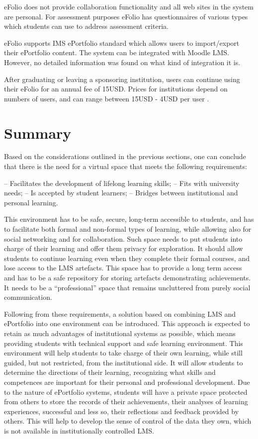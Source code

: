 eFolio does not provide collaboration functionality and all web sites in the
system are personal. For assessment purposes eFolio has questionnaires of
various types which students can use to address assessment criteria.

eFolio supports IMS ePortfolio standard which allows users to import/export
their ePortfolio content. The system can be integrated with Moodle LMS. However,
no detailed information was found on what kind of integration it is.

After graduating or leaving a sponsoring institution, users can continue
using their eFolio for an annual fee of 15USD. Prices for institutions depend
on numbers of users, and can range between 15USD - 4USD per user
\citep{AAEEBL2011}.

\section{Summary}

Based on the considerations outlined in the previous sections, one can conclude that there
is the need for a virtual space that meets the following requirements:

– Facilitates the development of lifelong learning skills;
– Fits with university needs;
– Is accepted by student learners;
– Bridges between institutional and personal learning.

This environment has to be safe, secure, long-term accessible to students, and has to
facilitate both formal and non-formal types of learning, while allowing also for social
networking and for collaboration. Such space needs to put students into charge of their
learning and offer them privacy for exploration. It should allow students to continue
learning even when they complete their formal courses, and lose access to the LMS
artefacts. This space has to provide a long term access and has to be a safe repository for
storing artefacts demonstrating achievements. It needs to be a “professional” space that
remains uncluttered from purely social communication.

Following from these requirements, a solution based on combining LMS and ePortfolio
into one environment can be introduced. This approach is expected to retain as much
advantages of institutional systems as possible, which means providing students with
technical support and safe learning environment. This environment will help students to
take charge of their own learning, while still guided, but not restricted, from the
institutional side. It will allow students to determine the directions of their learning,
recognizing what skills and competences are important for their personal and professional
development. Due to the nature of ePortfolio systems, students will have a private space
protected from others to store the records of their achievements, their analyses of learning
experiences, successful and less so, their reflections and feedback provided by others.
This will help to develop the sense of control of the data they own, which is not available
in institutionally controlled LMS.

